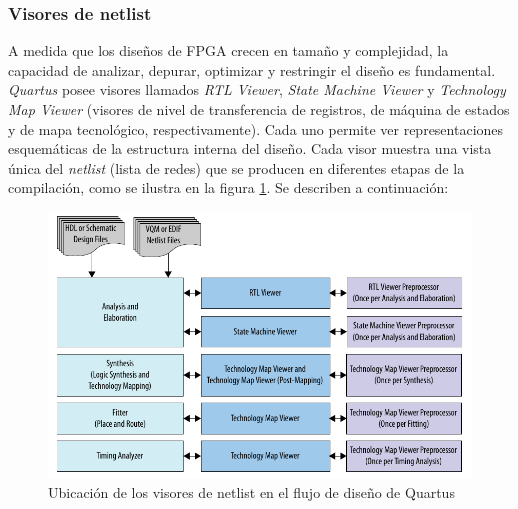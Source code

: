 \subsubsection{Visores de netlist}
\label{seccion: Visores de netlist}
A medida que los diseños de FPGA crecen en tamaño y complejidad, la capacidad de analizar, depurar, optimizar y restringir el diseño es fundamental. \textit{Quartus} posee visores llamados \textit{RTL Viewer}, \textit{State Machine Viewer} y \textit{Technology Map Viewer} (visores de nivel de transferencia de registros, de máquina de estados y de mapa tecnológico, respectivamente). Cada uno permite ver representaciones esquemáticas de la estructura interna del diseño. Cada visor muestra una vista única del \textit{netlist} (lista de redes) que se producen en diferentes etapas de la compilación, como se ilustra en la figura \ref{fig:netlist_viewers}. Se describen a continuación:

\begin{figure}
\centering
\includegraphics[scale=0.6]{./Figures/netlist_viewers.png}
\caption{Ubicación de los visores de netlist en el flujo de diseño de Quartus}
\label{fig:netlist_viewers}
\end{figure}

